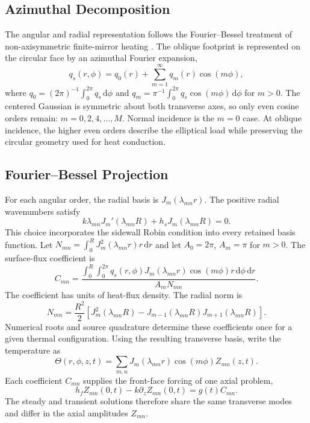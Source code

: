 \documentclass{optica-article}
\newcommand{\dd}{\,\mathrm{d}}
\begin{document}
\subsection{Azimuthal Decomposition}
The angular and radial representation follows the Fourier--Bessel treatment of non-axisymmetric finite-mirror heating \cite{vinet2009}.
The oblique footprint is represented on the circular face by an azimuthal Fourier expansion,
\begin{equation}
 q_s(r,\phi)=q_0(r)+\sum_{m=1}^{\infty}q_m(r)\cos(m\phi),
 \label{eq:fourier}
\end{equation}
where $q_0=(2\pi)^{-1}\int_0^{2\pi}q_s\dd\phi$ and $q_m=\pi^{-1}\int_0^{2\pi}q_s\cos(m\phi)\dd\phi$ for $m>0$.
The centered Gaussian is symmetric about both transverse axes, so only even cosine orders remain: $m=0,2,4,\ldots,M$.
Normal incidence is the $m=0$ case.
At oblique incidence, the higher even orders describe the elliptical load while preserving the circular geometry used for heat conduction.

\subsection{Fourier--Bessel Projection}
For each angular order, the radial basis is $J_m(\lambda_{mn}r)$.
The positive radial wavenumbers satisfy
\begin{equation}
 k\lambda_{mn}J_m'(\lambda_{mn}R)+h_sJ_m(\lambda_{mn}R)=0.
 \label{eq:radial}
\end{equation}
This choice incorporates the sidewall Robin condition into every retained basis function.
Let $N_{mn}=\int_0^R J_m^2(\lambda_{mn}r)r\dd r$ and let $A_0=2\pi$, $A_m=\pi$ for $m>0$.
The surface-flux coefficient is
\begin{equation}
 C_{mn}=\frac{\displaystyle\int_0^R\!\int_0^{2\pi}
 q_s(r,\phi)J_m(\lambda_{mn}r)\cos(m\phi)r\dd\phi\dd r}{A_mN_{mn}}.
 \label{eq:projection}
\end{equation}
The coefficient has units of heat-flux density.
The radial norm is
\begin{equation}
 N_{mn}=\frac{R^2}{2}\left[J_m^2(\lambda_{mn}R)
       -J_{m-1}(\lambda_{mn}R)J_{m+1}(\lambda_{mn}R)\right].
\end{equation}
Numerical roots and source quadrature determine these coefficients once for a given thermal configuration.
Using the resulting transverse basis, write the temperature as
\[
 \Theta(r,\phi,z,t)=\sum_{m,n}J_m(\lambda_{mn}r)\cos(m\phi)Z_{mn}(z,t).
\]
Each coefficient $C_{mn}$ supplies the front-face forcing of one axial problem,
\[
 h_fZ_{mn}(0,t)-k\partial_zZ_{mn}(0,t)=g(t)C_{mn}.
\]
The steady and transient solutions therefore share the same transverse modes and differ in the axial amplitudes $Z_{mn}$.
\end{document}
